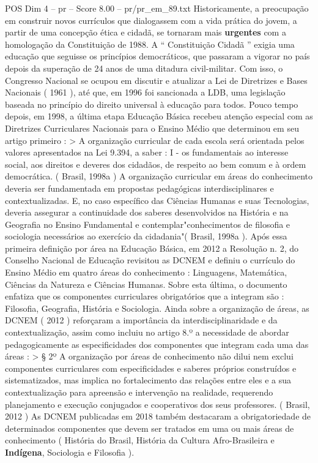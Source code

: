 \begin{textsample}{POS Dim 4 – pr – Score 8.00 – pr/pr\_em\_89.txt}
Historicamente, a preocupação em construir novos currículos que dialogassem com a vida prática do jovem, a partir de uma concepção ética e cidadã, se tornaram mais \textbf{urgentes} com a homologação da Constituição de 1988.
A “ Constituição Cidadã ” exigia uma educação que seguisse os princípios democráticos, que passaram a vigorar no país depois da superação de 24 anos de uma ditadura civil-militar.
Com isso, o Congresso Nacional se ocupou em discutir e atualizar a Lei de Diretrizes e Bases Nacionais ( 1961 ), até que, em 1996 foi sancionada a LDB, uma legislação baseada no princípio do direito universal à educação para todos.
Pouco tempo depois, em 1998, a última etapa Educação Básica recebeu atenção especial com as Diretrizes Curriculares Nacionais para o Ensino Médio que determinou em seu artigo primeiro : > A organização curricular de cada escola será orientada pelos valores apresentados na Lei 9.394, a saber : I - os fundamentais ao interesse social, aos direitos e deveres dos cidadãos, de respeito ao bem comum e à ordem democrática. ( Brasil, 1998a ) A organização curricular em áreas do conhecimento deveria ser fundamentada em propostas pedagógicas interdisciplinares e contextualizadas.
E, no caso específico das Ciências Humanas e suas Tecnologias, deveria assegurar a continuidade dos saberes desenvolvidos na História e na Geografia no Ensino Fundamental e contemplar"conhecimentos de filosofia e sociologia necessários ao exercício da cidadania"( Brasil, 1998a ).
Após essa primeira definição por área na Educação Básica, em 2012 a Resolução n. 2, do Conselho Nacional de Educação revisitou as DCNEM e definiu o currículo do Ensino Médio em quatro áreas do conhecimento : Linguagens, Matemática, Ciências da Natureza e Ciências Humanas.
Sobre esta última, o documento enfatiza que os componentes curriculares obrigatórios que a integram são : Filosofia, Geografia, História e Sociologia.
Ainda sobre a organização de áreas, as DCNEM ( 2012 ) reforçaram a importância da interdisciplinaridade e da contextualização, assim como incluiu no artigo 8.º a necessidade de abordar pedagogicamente as especificidades dos componentes que integram cada uma das áreas : > § 2º A organização por áreas de conhecimento não dilui nem exclui componentes curriculares com especificidades e saberes próprios construídos e sistematizados, mas implica no fortalecimento das relações entre eles e a sua contextualização para apreensão e intervenção na realidade, requerendo planejamento e execução conjugados e cooperativos dos seus professores. ( Brasil, 2012 ) As DCNEM publicadas em 2018 também destacaram a obrigatoriedade de determinados componentes que devem ser tratados em uma ou mais áreas de conhecimento ( História do Brasil, História da Cultura Afro-Brasileira e \textbf{Indígena}, Sociologia e Filosofia ).

\end{textsample}
